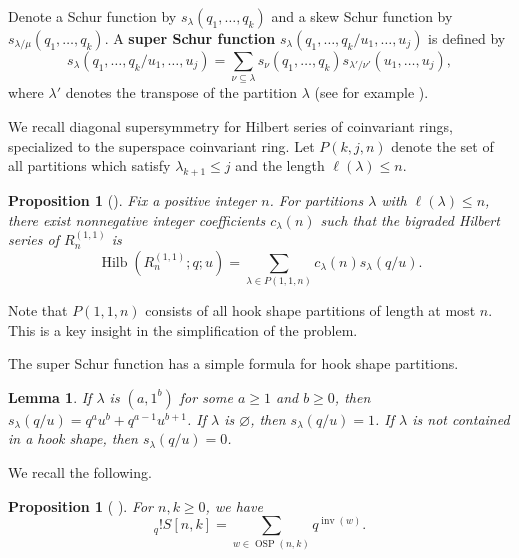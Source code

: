 \documentclass[11pt]{amsart}
\newtheorem{proposition}[theorem]{Proposition}
\newtheorem{lemma}[theorem]{Lemma}
\theoremstyle{definition}
\newcommand{\0}{\emptyset}
\DeclareMathOperator{\Hilb}{Hilb}
\DeclareMathOperator{\OSP}{OSP}
\DeclareMathOperator{\inv}{inv}
\begin{document}
Denote a Schur function by $s_\lambda(q_1,\ldots,q_k)$ and a skew Schur function by $s_{\lambda/\mu}(q_1,\ldots,q_k)$.
A \textbf{super Schur function} $s_\lambda(q_1,\ldots,q_k/u_1,\ldots,u_j)$ is defined by 
\begin{equation}
    s_\lambda(q_1,\ldots,q_k/u_1,\ldots,u_j) = \sum_{\nu \subseteq \lambda} s_\nu(q_1,\ldots,q_k)s_{\lambda'/\nu'}(u_1,\ldots,u_j),
\end{equation}
where $\lambda'$ denotes the transpose of the partition $\lambda$ (see for example \cite[Sections A.2.2 and 3.2]{ChengWangBook}).

We recall diagonal supersymmetry for Hilbert series of coinvariant rings, specialized to the superspace coinvariant ring.
Let $P(k,j,n)$ denote the set of all partitions which satisfy $\lambda_{k+1} \leq j$ and the length $\ell(\lambda) \leq n$.

\begin{proposition}[\!\!\cite{Lentfer-Supersymmetry}]\label{prop:ds}
    Fix a positive integer $n$. For partitions $\lambda$ with $\ell(\lambda) \leq n$, there exist nonnegative integer coefficients $c_\lambda(n)$ such that the bigraded Hilbert series of $R_n^{(1,1)}$ is
\begin{equation}\label{eq:coeffs-Hilbert}
    \Hilb(R_n^{(1,1)}; q;u) = \sum_{\lambda \in P(1,1,n)} c_{\lambda}(n) s_\lambda(q/u).
\end{equation}
\end{proposition}
Note that $P(1,1,n)$ consists of all hook shape partitions of length at most $n$. This is a key insight in the simplification of the problem.


The super Schur function has a simple formula for hook shape partitions.

\begin{lemma}\label{lem:schur-1-1}
    If $\lambda$ is $(a,1^b)$ for some $a \geq 1$ and $b \geq 0$, then $s_\lambda(q/u) = q^au^b + q^{a-1}u^{b+1}$. 
    If $\lambda$ is $\varnothing$, then $s_\lambda(q/u) = 1$.
    If $\lambda$ is not contained in a hook shape, then $s_\lambda(q/u) = 0$.
\end{lemma}

We recall the following.

\begin{proposition}[\!\! {\cite[Theorem 5.1]{SaganSwanson2024}}]\label{prop:OSP-inv}
For $n, k \geq 0$, we have
    \begin{equation}
        [k]_q! S[n,k] = \sum_{w \in \OSP(n,k)}q^{\inv(w)}.
    \end{equation}
\end{proposition}
\end{document}
